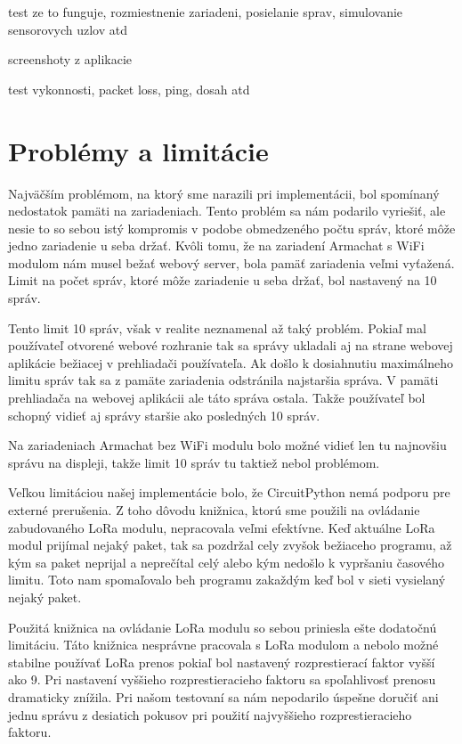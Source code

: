 \documentclass[slovak,master]{diploma}
\begin{document}
test ze to funguje, rozmiestnenie zariadeni, posielanie sprav, simulovanie sensorovych uzlov atd

screenshoty z aplikacie

test vykonnosti, packet loss, ping, dosah atd

\section{Problémy a limitácie}
Najväčším problémom, na ktorý sme narazili pri implementácii, bol spomínaný nedostatok pamäti na zariadeniach. Tento problém sa nám podarilo 
vyriešiť, ale nesie to so sebou istý kompromis v podobe obmedzeného počtu správ, ktoré môže jedno zariadenie u seba držať. Kvôli tomu, že na 
zariadení Armachat s WiFi modulom nám musel bežať webový server, bola pamäť zariadenia veľmi vyťažená. Limit na počet správ, ktoré môže zariadenie u seba držať, bol nastavený 
na 10 správ. 

Tento limit 10 správ, však v realite neznamenal až taký problém. Pokiaľ mal používateľ otvorené webové rozhranie tak sa správy ukladali aj na strane webovej aplikácie 
bežiacej v prehliadači používateľa. Ak došlo k dosiahnutiu maximálneho limitu správ tak sa z pamäte zariadenia odstránila najstaršia správa. V pamäti prehliadača na webovej aplikácii 
ale táto správa ostala. Takže používateľ bol schopný vidieť aj správy staršie ako posledných 10 správ.

Na zariadeniach Armachat bez WiFi modulu bolo možné vidieť len tu najnovšiu správu na displeji, takže limit 10 správ tu taktiež nebol problémom.

Veľkou limitáciou našej implementácie bolo, že CircuitPython nemá podporu pre externé prerušenia. Z toho dôvodu knižnica, ktorú sme použili na ovládanie zabudovaného LoRa modulu, 
nepracovala veľmi efektívne. Keď aktuálne LoRa modul prijímal nejaký paket, tak sa pozdržal cely zvyšok bežiaceho programu, až kým sa paket neprijal a neprečítal celý alebo kým nedošlo k vypršaniu 
časového limitu. Toto nam spomaľovalo beh programu zakaždým keď bol v sieti vysielaný nejaký paket.

Použitá knižnica na ovládanie LoRa modulu so sebou priniesla ešte dodatočnú limitáciu. Táto knižnica nesprávne pracovala s LoRa modulom a nebolo možné stabilne používať 
LoRa prenos pokiaľ bol nastavený rozprestierací faktor vyšší ako 9. Pri nastavení vyššieho rozprestieracieho faktoru sa spoľahlivosť prenosu dramaticky znížila. Pri 
našom testovaní sa nám nepodarilo úspešne doručiť ani jednu správu z desiatich pokusov pri použití najvyššieho rozprestieracieho faktoru.
\end{document}
